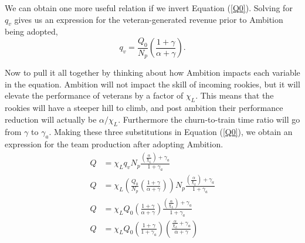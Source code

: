 \documentclass[paper=a4, fontsize=11pt abstract]{scrartcl}
\numberwithin{equation}{section}		%
\numberwithin{figure}{section}			%
\numberwithin{table}{section}				%
\begin{document}
We can obtain one more useful relation if we invert Equation (\ref{Q0}).  Solving for $q_{v}$ gives us an expression for the veteran-generated revenue prior to Ambition being adopted,
\begin{equation}
    q_{v} = \frac{Q_0}{N_p}\left(\frac{1 + \gamma}{\alpha + \gamma}\right).
\end{equation}

Now to pull it all together by thinking about how Ambition impacts each variable in the equation.  Ambition will not impact the skill of incoming rookies, but it will elevate the performance of veterans by a factor of $\chi_L$.  This means that the rookies will have a steeper hill to climb, and post ambition their performance reduction will actually be $\alpha / \chi_L$.  Furthermore the churn-to-train time ratio will go from $\gamma$ to $\gamma_a$.  Making these three substitutions in Equation (\ref{Q0}), we obtain an expression for the team production after adopting Ambition.
\begin{align}
    Q &= \chi_L q_{v} N_p \frac{\left(\frac{\alpha}{\chi_L}\right) + \gamma_a}{1 + \gamma_a} \\
    Q &= \chi_L \left(     \frac{Q_0}{N_p}\left(\frac{1 + \gamma}{\alpha + \gamma}\right)             \right) N_p \frac{\left(\frac{\alpha}{\chi_L}\right) + \gamma_a}{1 + \gamma_a} \\
    Q &= \chi_L Q_0  \left(\frac{1 + \gamma}{\alpha + \gamma}  \right)  \frac{\left(\frac{\alpha}{\chi_L}\right) + \gamma_a}{1 + \gamma_a} \\
    Q &= \chi_L Q_0  \left(\frac{1+\gamma}{1 + \gamma_a}\right) \left(\frac{\frac{\alpha}{\chi_L} + \gamma_a  }{\alpha + \gamma}\right)
\end{align}


\end{document}

